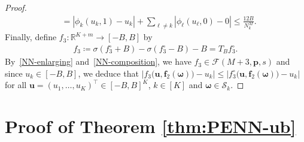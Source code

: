 \documentclass[12pt]{article}
\begin{document}
\begin{proof}
\begin{align*}
        &=|\phi_k(u_k,1) - u_k| + \sum_{\ell\neq k} |\phi_\ell(u_\ell, 0) - 0|\leq \frac{12B}{N_k^M}. 
    \end{align*}
    Finally, define $f_3: \mathbb{R}^{K+m} \to [-B,B]$ by
    \begin{align*}
        f_3 \coloneqq \sigma(f_3^\circ + B) - \sigma(f_3^\circ - B) - B = T_B f_3^\circ.
    \end{align*}
    By~\ref{NN-enlarging} and~\ref{NN-composition}, we have $f_3 \in \mathcal{F}(M+3,\bm p,s)$ and since $u_k \in [-B,B]$, we deduce that $\bigl|f_3\bigl(\bm u, \bm f_2(\bm\omega)\bigr) - u_k \bigr| \leq \bigl|f_3^\circ\bigl(\bm u, \bm f_2(\bm\omega)\bigr) - u_k \bigr|$ for all $\bm u=(u_1,\ldots,u_K)^\top \in [-B,B]^K$, $k\in[K]$ and $\bm\omega \in \mathcal{S}_k$.
\end{proof}


\section{Proof of Theorem \ref{thm:PENN-ub}}
\end{document}
